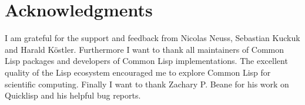 \documentclass[sigconf]{acmart}
\theoremstyle{definition}
\begin{document}

\maketitle







\section{Acknowledgments}

I am grateful for the support and feedback from Nicolas Neuss, Sebastian
Kuckuk and Harald Köstler. Furthermore I want to thank all maintainers of
Common Lisp packages and developers of Common Lisp implementations. The
excellent quality of the Lisp ecosystem encouraged me to explore Common
Lisp for scientific computing. Finally I want to thank Zachary P. Beane for
his work on Quicklisp and his helpful bug reports.



\end{document}
